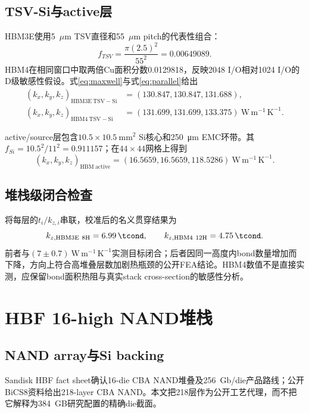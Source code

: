 \documentclass[UTF8,zihao=-4]{ctexart}
\newcommand{\kxyz}{(k_x,k_y,k_z)}
\newcommand{\unitk}{\mathrm{W\,m^{-1}\,K^{-1}}}
\begin{document}
\subsection{TSV-Si与active层}

HBM3E使用5~$\mu\mathrm{m}$ TSV直径和55~$\mu\mathrm{m}$ pitch的代表性组合\cite{OhbaEtAl2022}：
\begin{equation}
  f_{TSV}=\frac{\pi(2.5)^2}{55^2}=0.00649089.
\end{equation}
HBM4在相同窗口中取两倍Cu面积分数0.0129818，反映2048 I/O相对1024 I/O的D级敏感性假设。式\eqref{eq:maxwell}与式\eqref{eq:parallel}给出
\begin{align}
  \kxyz_{\mathrm{HBM3E\ TSV-Si}}&=(130.847,130.847,131.688),\\
  \kxyz_{\mathrm{HBM4\ TSV-Si}}&=(131.699,131.699,133.375)~\unitk.
\end{align}

active/source层包含$10.5\times10.5~\mathrm{mm^2}$ Si核心和\SI{250}{\micro\metre} EMC环带。其$f_{Si}=10.5^2/11^2=0.911157$；在$44\times44$网格上得到
\begin{equation}
  \kxyz_{\mathrm{HBM\ active}}=(16.5659,16.5659,118.5286)~\unitk.
\end{equation}

\subsection{堆栈级闭合检查}

将每层的$t_i/k_{z,i}$串联，校准后的名义贯穿结果为
\begin{equation}
  k_{z,\mathrm{HBM3E\ 8H}}=\SI{6.99}{\tcond},\qquad
  k_{z,\mathrm{HBM4\ 12H}}=\SI{4.75}{\tcond}.
\end{equation}
前者与$(7\pm0.7)~\unitk$实测目标闭合；后者因同一高度内bond数量增加而下降，方向上符合高堆叠层数加剧热瓶颈的公开FEA结论\cite{SongYoon2025}。HBM4数值不是直接实测，应保留bond面积热阻与真实stack cross-section的敏感性分析。

\section{HBF 16-high NAND堆栈}

\subsection{NAND array与Si backing}

Sandisk HBF fact sheet确认16-die CBA NAND堆叠及256~Gb/die产品路线\cite{SandiskHBFFactSheet}；公开BiCS8资料给出218-layer CBA NAND\cite{SandiskBiCS8}。本文把218层作为公开工艺代理，而不把它解释为384~GB研究配置的精确die截面。
\end{document}
